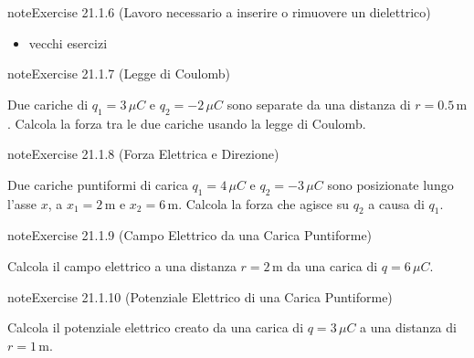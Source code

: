 \documentclass[letterpaper,10pt,italian]{jupyterBook}
\begin{document}
\begin{sphinxadmonition}{note}{Exercise 21.1.6 (Lavoro necessario a inserire o rimuovere un dielettrico)}


\end{sphinxadmonition}
\begin{itemize}
\item {} 
\sphinxAtStartPar
vecchi esercizi

\end{itemize}
 \label{exercise:ch/electromagnetism/electrostatics-problems-exercise-6}

\begin{sphinxadmonition}{note}{Exercise 21.1.7 (Legge di Coulomb)}



\sphinxAtStartPar
Due cariche di \(q_1 = 3 \, \mu C\) e \(q_2 = -2 \, \mu C\) sono separate da una distanza di \(r = 0.5 \, \text{m}\). Calcola la forza tra le due cariche usando la legge di Coulomb.
\end{sphinxadmonition}
 \label{exercise:ch/electromagnetism/electrostatics-problems-exercise-7}

\begin{sphinxadmonition}{note}{Exercise 21.1.8 (Forza Elettrica e Direzione)}



\sphinxAtStartPar
Due cariche puntiformi di carica \(q_1 = 4 \, \mu C\) e \(q_2 = -3 \, \mu C\) sono posizionate lungo l’asse \(x\), a \(x_1 = 2 \, \text{m}\) e \(x_2 = 6 \, \text{m}\). Calcola la forza che agisce su \(q_2\) a causa di \(q_1\).
\end{sphinxadmonition}
 \label{exercise:ch/electromagnetism/electrostatics-problems-exercise-8}

\begin{sphinxadmonition}{note}{Exercise 21.1.9 (Campo Elettrico da una Carica Puntiforme)}



\sphinxAtStartPar
Calcola il campo elettrico a una distanza \(r = 2 \, \text{m}\) da una carica di \(q = 6 \, \mu C\).
\end{sphinxadmonition}
 \label{exercise:ch/electromagnetism/electrostatics-problems-exercise-9}

\begin{sphinxadmonition}{note}{Exercise 21.1.10 (Potenziale Elettrico di una Carica Puntiforme)}



\sphinxAtStartPar
Calcola il potenziale elettrico creato da una carica di \(q = 3 \, \mu C\) a una distanza di \(r = 1 \, \text{m}\).
\end{sphinxadmonition}
 \label{exercise:ch/electromagnetism/electrostatics-problems-exercise-10}
\end{document}
